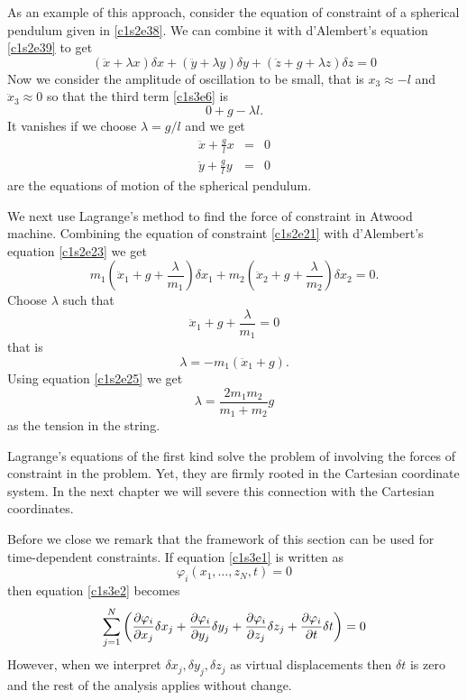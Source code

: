 As an example of this approach, consider the equation of constraint of a 
spherical pendulum given in \eqref{c1s2e38}. We can combine it with 
d'Alembert's equation \eqref{c1s2e39} to get
\begin{equation}\label{c1s3e6}
(\ddot{x} + \lambda x)\delta{x} + (\ddot{y} + \lambda y)\delta{y} + 
(\ddot{z} + g + \lambda z)\delta{z} = 0
\end{equation}
Now we consider the amplitude of oscillation to be small, that is $x_3 \approx
-l$ and $\ddot{x}_3 \approx 0$ so that the third term \eqref{c1s3e6} is
\[
0 + g - \lambda l.
\]
It vanishes if we choose $\lambda = g/l$ and we get
\begin{eqnarray}
\ddot{x} + \frac{g}{l}x &=& 0 \\
\ddot{y} + \frac{g}{l}y &=& 0 
\end{eqnarray}
are the equations of motion of the spherical pendulum.

We next use Lagrange's method to find the force of constraint in Atwood 
machine. Combining the equation of constraint \eqref{c1s2e21} with 
d'Alembert's equation \eqref{c1s2e23} we get
\begin{equation}
m_1\left(\ddot{x}_1 + g + \frac{\lambda}{m_1}\right)\delta x_1 + 
m_2\left(\ddot{x}_2 + g + \frac{\lambda}{m_2}\right)\delta x_2 = 0.
\end{equation}
Choose $\lambda$ such that
\begin{equation}
\ddot{x}_1 + g + \frac{\lambda}{m_1} = 0
\end{equation}
that is
\begin{equation}
\lambda = -m_1(\ddot{x}_1 + g).
\end{equation}
Using equation \eqref{c1s2e25} we get
\begin{equation}
\lambda = \frac{2m_1m_2}{m_1 + m_2}g
\end{equation}
as the tension in the string.

Lagrange's equations of the first kind solve the problem of involving the
forces of constraint in the problem. Yet, they are firmly rooted in the 
Cartesian coordinate system. In the next chapter we will severe this connection
with the Cartesian coordinates.

Before we close we remark that the framework of this section can be used
for time-dependent constraints. If equation \eqref{c1s3e1} is written as
\begin{equation}\label{c1s3e13}
\varphi_i(x_1, \ldots, z_N, t) = 0
\end{equation}
then equation \eqref{c1s3e2} becomes
\begin{equation}\label{c1s3e14}
\sum_{j=1}^{N}\left(\frac{\partial{\varphi_i}}{\partial{x_j}}\delta x_j 
+ \frac{\partial{\varphi_i}}{\partial{y_j}}\delta y_j
+ \frac{\partial{\varphi_i}}{\partial{z_j}}\delta z_j + \frac{\partial{\varphi_i}}{\partial{t}}\delta t\right) = 0
\end{equation}
However, when we interpret $\delta x_j, \delta y_j, \delta z_j$ as virtual 
displacements then $\delta t$ is zero and the rest of the analysis applies 
without change.
